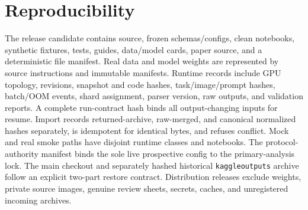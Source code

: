\section{Reproducibility}
The release candidate contains source, frozen schemas/configs, clean notebooks, synthetic fixtures,
tests, guides, data/model cards, paper source, and a deterministic file manifest. Real data and model
weights are represented by source instructions and immutable manifests. Runtime records include GPU
topology, revisions, snapshot and code hashes, task/image/prompt hashes, batch/OOM events, shard
assignment, parser version, raw outputs, and validation reports. A complete run-contract hash binds
all output-changing inputs for resume. Import records returned-archive, raw-merged, and canonical
normalized hashes separately, is idempotent for identical bytes, and refuses conflict. Mock and real
smoke paths have disjoint runtime classes and notebooks.
The protocol-authority manifest binds the sole live prospective config to the primary-analysis lock.
The main checkout and separately hashed historical \texttt{kaggleoutputs} archive follow an explicit
two-part restore contract. Distribution releases exclude weights, private source images, genuine
review sheets, secrets, caches, and unregistered incoming archives.
